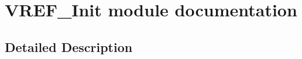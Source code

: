 \hypertarget{group___v_r_e_f___init__module}{}\section{V\+R\+E\+F\+\_\+\+Init module documentation}
\label{group___v_r_e_f___init__module}


\subsection{Detailed Description}
